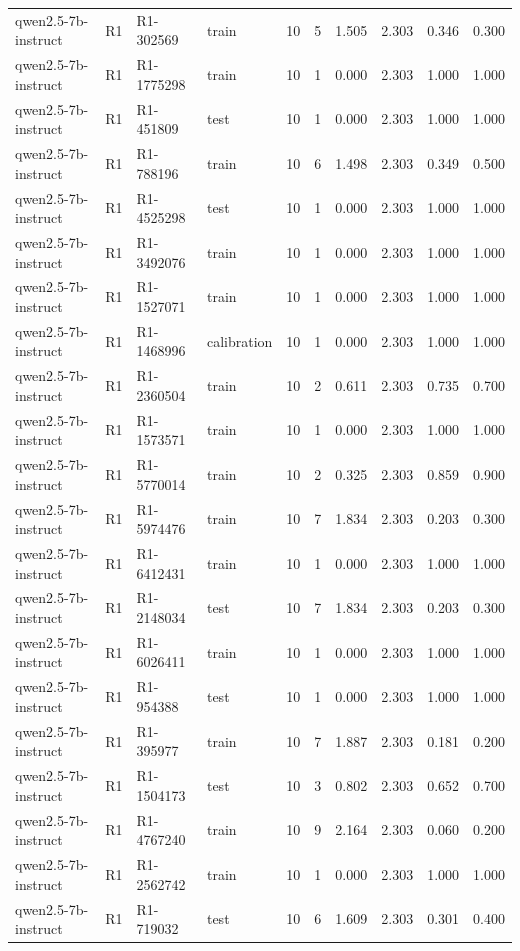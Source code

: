\begin{table}
\begin{tabular}{llllrrrrrr}
qwen2.5-7b-instruct & R1 & R1-302569 & train & 10 & 5 & 1.505 & 2.303 & 0.346 & 0.300 \\
qwen2.5-7b-instruct & R1 & R1-1775298 & train & 10 & 1 & 0.000 & 2.303 & 1.000 & 1.000 \\
qwen2.5-7b-instruct & R1 & R1-451809 & test & 10 & 1 & 0.000 & 2.303 & 1.000 & 1.000 \\
qwen2.5-7b-instruct & R1 & R1-788196 & train & 10 & 6 & 1.498 & 2.303 & 0.349 & 0.500 \\
qwen2.5-7b-instruct & R1 & R1-4525298 & test & 10 & 1 & 0.000 & 2.303 & 1.000 & 1.000 \\
qwen2.5-7b-instruct & R1 & R1-3492076 & train & 10 & 1 & 0.000 & 2.303 & 1.000 & 1.000 \\
qwen2.5-7b-instruct & R1 & R1-1527071 & train & 10 & 1 & 0.000 & 2.303 & 1.000 & 1.000 \\
qwen2.5-7b-instruct & R1 & R1-1468996 & calibration & 10 & 1 & 0.000 & 2.303 & 1.000 & 1.000 \\
qwen2.5-7b-instruct & R1 & R1-2360504 & train & 10 & 2 & 0.611 & 2.303 & 0.735 & 0.700 \\
qwen2.5-7b-instruct & R1 & R1-1573571 & train & 10 & 1 & 0.000 & 2.303 & 1.000 & 1.000 \\
qwen2.5-7b-instruct & R1 & R1-5770014 & train & 10 & 2 & 0.325 & 2.303 & 0.859 & 0.900 \\
qwen2.5-7b-instruct & R1 & R1-5974476 & train & 10 & 7 & 1.834 & 2.303 & 0.203 & 0.300 \\
qwen2.5-7b-instruct & R1 & R1-6412431 & train & 10 & 1 & 0.000 & 2.303 & 1.000 & 1.000 \\
qwen2.5-7b-instruct & R1 & R1-2148034 & test & 10 & 7 & 1.834 & 2.303 & 0.203 & 0.300 \\
qwen2.5-7b-instruct & R1 & R1-6026411 & train & 10 & 1 & 0.000 & 2.303 & 1.000 & 1.000 \\
qwen2.5-7b-instruct & R1 & R1-954388 & test & 10 & 1 & 0.000 & 2.303 & 1.000 & 1.000 \\
qwen2.5-7b-instruct & R1 & R1-395977 & train & 10 & 7 & 1.887 & 2.303 & 0.181 & 0.200 \\
qwen2.5-7b-instruct & R1 & R1-1504173 & test & 10 & 3 & 0.802 & 2.303 & 0.652 & 0.700 \\
qwen2.5-7b-instruct & R1 & R1-4767240 & train & 10 & 9 & 2.164 & 2.303 & 0.060 & 0.200 \\
qwen2.5-7b-instruct & R1 & R1-2562742 & train & 10 & 1 & 0.000 & 2.303 & 1.000 & 1.000 \\
qwen2.5-7b-instruct & R1 & R1-719032 & test & 10 & 6 & 1.609 & 2.303 & 0.301 & 0.400 \\

\end{tabular}
\end{table}
